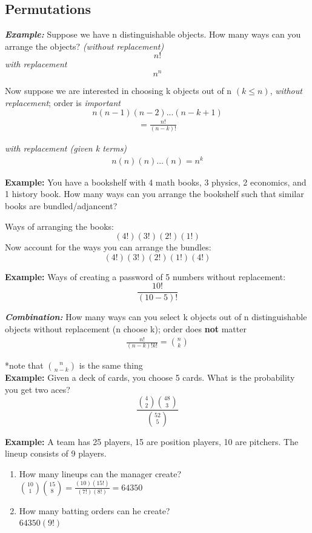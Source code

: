\documentclass[12pt]{article}
\begin{document}
    \subsection{Permutations}

    \textit{\textbf{Example:}} Suppose we have n distinguishable 
    objects. How many ways can you arrange the objects? 
    \textit{(without replacement)} 
    $$n!$$
    \textit{with replacement}
    $$n^n$$

    Now suppose we are interested in choosing k objects out of n 
    $(k \leq n)$, \textit{without replacement}; order is 
    \textit{important}
    $$n(n-1)(n-2)...(n-k+1)$$
    \begin{align}
        =\frac{n!}{(n-k)!}
    \end{align}

    \textit{with replacement (given k terms)}
    \begin{align}
        n(n)(n)...(n) = n^k
    \end{align}

    \textbf{Example:} You have a bookshelf with 4 math books, 3 
    physics, 2 economics, and 1 history book. How many ways can you 
    arrange the bookshelf such that similar books are bundled/adjancent?

    Ways of arranging the books:
    $$(4!)(3!)(2!)(1!)$$
    Now account for the ways you can arrange the bundles:
    $$(4!)(3!)(2!)(1!)(4!)$$

    \textbf{Example:} Ways of creating a password of 5 numbers 
    without replacement:
    $$\frac{10!}{(10-5)!}$$

    \textit{\textbf{Combination:}} How many ways can you select k 
    objects out of n distinguishable objects without replacement 
    (n choose k); order does \textbf{not} matter
    \begin{align}
        \frac{n!}{(n-k)!k!} = \binom{n}{k}
    \end{align}

    *note that $\binom{n}{n-k}$ is the same thing\\[\baselineskip]
    \textbf{Example:} Given a deck of cards, you choose 5 cards. 
    What is the probability you get two aces?
    $$\frac{\binom{4}{2}\binom{48}{3}}{\binom{52}{5}}$$

    \textbf{Example:} A team has 25 players, 15 are position players, 
    10 are pitchers. The lineup consists of 9 players.
    \begin{enumerate}[label=(\alph*)]
        \item How many lineups can the manager create?\\
        $\binom{10}{1}\binom{15}{8} = \frac{(10)(15!)}{(7!)(8!)} = 64350$
        \item How many batting orders can he create?\\
        $64350(9!)$
    \end{enumerate}
\end{document}
